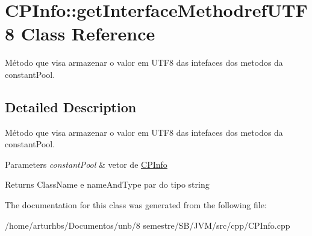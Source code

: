 \hypertarget{classCPInfo_1_1getInterfaceMethodrefUTF8}{}\section{C\+P\+Info\+:\+:get\+Interface\+Methodref\+U\+T\+F8 Class Reference}
\label{classCPInfo_1_1getInterfaceMethodrefUTF8}


Método que visa armazenar o valor em U\+T\+F8 das intefaces dos metodos da constant\+Pool.  




\subsection{Detailed Description}
Método que visa armazenar o valor em U\+T\+F8 das intefaces dos metodos da constant\+Pool. 


\begin{DoxyParams}{Parameters}
{\em constant\+Pool} & vetor de \hyperlink{classCPInfo}{C\+P\+Info} \\
\hline
\end{DoxyParams}
\begin{DoxyReturn}{Returns}
Class\+Name e name\+And\+Type par do tipo string 
\end{DoxyReturn}


The documentation for this class was generated from the following file\+:\begin{DoxyCompactItemize}
\item 
/home/arturhbs/\+Documentos/unb/8 semestre/\+S\+B/\+J\+V\+M/src/cpp/C\+P\+Info.\+cpp\end{DoxyCompactItemize}
